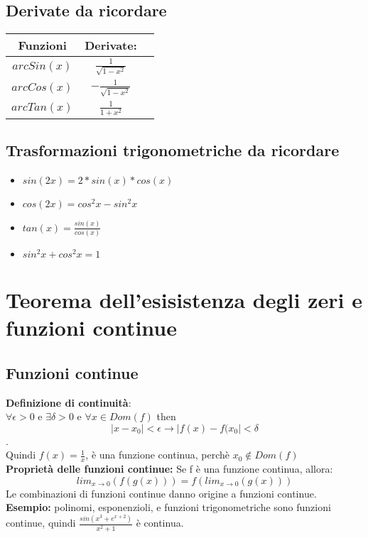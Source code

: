 \documentclass[11pt]{article}
\begin{document}
\subsection{Derivate da ricordare}
\begin{center}
 \begin{tabular}{|c|c|c|}
 \hline
 Funzioni & Derivate:\\
 \hline \hline
 $arcSin(x)$ & $\frac{1}{\sqrt{1-x^{2}}}$\\
 \hline
 $arcCos(x)$ & $-\frac{1}{\sqrt{1-x^{2}}}$\\
 \hline
 $arcTan(x)$ & $\frac{1}{1+x^{2}}$\\
 \hline
 \end{tabular}
\end{center}
\subsection{Trasformazioni trigonometriche da ricordare}
\begin{itemize}
    \item $sin(2x) = 2*sin(x)*cos(x)$
    \item $cos(2x) = cos^{2}x - sin^{2}x$
    \item $tan(x) = \frac{sin(x)}{cos(x)}$
    \item $sin^{2}x + cos^{2}x = 1$
\end{itemize}
\section{Teorema dell'esisistenza degli zeri e funzioni continue}
\subsection{Funzioni continue}
\textbf{Definizione di continuità}:\\
$\forall \epsilon > 0$ e $\exists \delta > 0$ e $\forall x \in Dom(f)$
then $$|x - x_{0}| < \epsilon \rightarrow |f(x) - f(x_{0}| < \delta$$.\\
Quindi $f(x) = \frac{1}{x}$, è una funzione continua, perchè $x_{0} \notin Dom(f)$\\
\textbf{Proprietà delle funzioni continue:} Se f è una funzione continua, allora: $$lim_{x \rightarrow 0}(f(g(x))) = f(lim_{x \rightarrow 0}(g(x)))$$
Le combinazioni di funzioni continue danno origine a funzioni continue. \\\textbf{Esempio:} polinomi, esponenzioli, e funzioni trigonometriche 
sono funzioni continue, quindi $\frac{sin(x^{3} + e^{x+2})}{x^{2}+1}$ è  continua.\\
\end{document}
